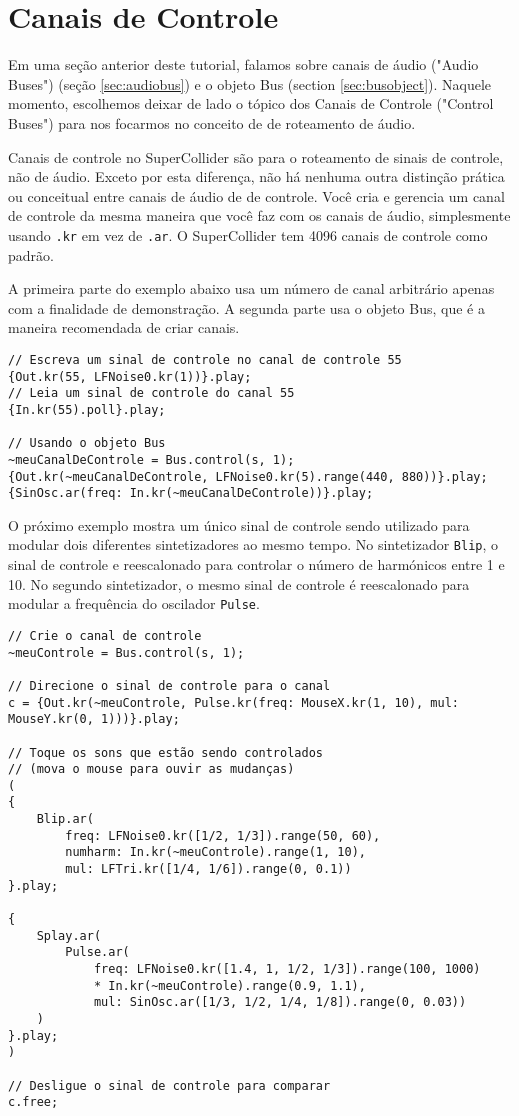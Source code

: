 \section{Canais de Controle}
\label{sec:control-buses}

Em uma seção anterior deste tutorial, falamos sobre canais de áudio ("Audio Buses") (seção \ref{sec:audiobus}) e o objeto Bus (section \ref{sec:busobject}). Naquele momento, escolhemos deixar de lado o tópico dos Canais de Controle ("Control Buses") para nos focarmos no conceito de de roteamento de áudio.

Canais de controle no SuperCollider são para o roteamento de sinais de controle, não de áudio. Exceto por esta diferença, não há nenhuma outra distinção prática ou conceitual entre canais de áudio de de controle. Você cria e gerencia um canal de controle da mesma maneira que você faz com os canais de áudio, simplesmente usando \texttt{.kr} em vez de \texttt{.ar}. O SuperCollider tem  4096 canais de controle como padrão.

A primeira parte do exemplo abaixo usa um número de canal arbitrário apenas com a finalidade de demonstração. A segunda parte usa o objeto Bus, que é a maneira recomendada de criar canais.


\begin{lstlisting}[style=SuperCollider-IDE, basicstyle=\scttfamily\footnotesize]
// Escreva um sinal de controle no canal de controle 55
{Out.kr(55, LFNoise0.kr(1))}.play;
// Leia um sinal de controle do canal 55
{In.kr(55).poll}.play;

// Usando o objeto Bus
~meuCanalDeControle = Bus.control(s, 1);
{Out.kr(~meuCanalDeControle, LFNoise0.kr(5).range(440, 880))}.play;
{SinOsc.ar(freq: In.kr(~meuCanalDeControle))}.play;
\end{lstlisting}

O próximo exemplo mostra um único sinal de controle sendo utilizado para modular dois diferentes sintetizadores ao mesmo tempo. No sintetizador \texttt{Blip}, o sinal de controle e reescalonado para controlar o número de harmónicos entre 1 e 10. No segundo sintetizador, o mesmo sinal de controle é reescalonado para modular a frequência do oscilador \texttt{Pulse}.

\begin{lstlisting}[style=SuperCollider-IDE, basicstyle=\scttfamily\footnotesize]
// Crie o canal de controle
~meuControle = Bus.control(s, 1);

// Direcione o sinal de controle para o canal
c = {Out.kr(~meuControle, Pulse.kr(freq: MouseX.kr(1, 10), mul: MouseY.kr(0, 1)))}.play;

// Toque os sons que estão sendo controlados
// (mova o mouse para ouvir as mudanças)
(
{
	Blip.ar(
		freq: LFNoise0.kr([1/2, 1/3]).range(50, 60),
		numharm: In.kr(~meuControle).range(1, 10),
		mul: LFTri.kr([1/4, 1/6]).range(0, 0.1))
}.play;

{
	Splay.ar(
		Pulse.ar(
			freq: LFNoise0.kr([1.4, 1, 1/2, 1/3]).range(100, 1000)
			* In.kr(~meuControle).range(0.9, 1.1),
			mul: SinOsc.ar([1/3, 1/2, 1/4, 1/8]).range(0, 0.03))
	)
}.play;
)

// Desligue o sinal de controle para comparar
c.free;
\end{lstlisting}

